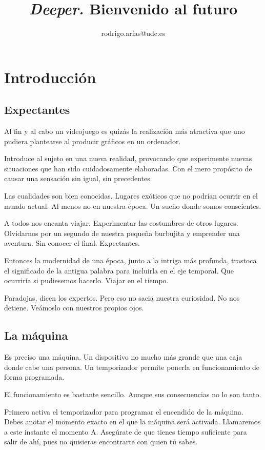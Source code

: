 \documentclass[11pt,a4paper]{article}
\title{\textbf{\emph{Deeper.} Bienvenido al futuro}}
\author{rodrigo.arias@udc.es}
\date{}
\begin{document}
\maketitle

\section{Introducción}
\subsection{Expectantes}

Al fin y al cabo un videojuego es quizás la realización más atractiva que uno pudiera 
plantearse al producir gráficos en un ordenador.

Introduce al sujeto en una nueva realidad, provocando que experimente nuevas 
situaciones que han sido cuidadosamente elaboradas. Con el mero propósito de 
causar una sensación sin igual, sin precedentes.

Las cualidades son bien conocidas. Lugares exóticos que no podrían ocurrir en el 
mundo actual. Al menos no en nuestra época. Un sueño donde somos conscientes.  

A todos nos encanta viajar. Experimentar las costumbres de otros lugares.  
Olvidarnos por un segundo de nuestra pequeña burbujita y emprender una aventura.  
Sin conocer el final. Expectantes.

Entonces la modernidad de una época, junto a la intriga más profunda, trastoca 
el significado de la antigua palabra para incluirla en el eje temporal. Que 
ocurriría si pudiesemos hacerlo. Viajar en el tiempo.

Paradojas, dicen los expertos. Pero eso no sacia nuestra curiosidad. No nos 
detiene. Veámoslo con nuestros propios ojos.

\subsection{La máquina}

Es preciso una máquina. Un dispositivo no mucho más grande que una caja donde 
cabe una persona. Un temporizador permite ponerla en funcionamiento de forma programada.

El funcionamiento es bastante sencillo. Aunque sus consecuencias no lo son 
tanto.

Primero activa el temporizador para programar el encendido de la máquina.  
Debes anotar el momento exacto en el que la máquina será activada. Llamaremos a 
este instante el momento A. Asegúrate de que tienes tiempo suficiente para salir 
de ahí, pues no quisieras encontrarte con quien tú sabes.
\end{document}
